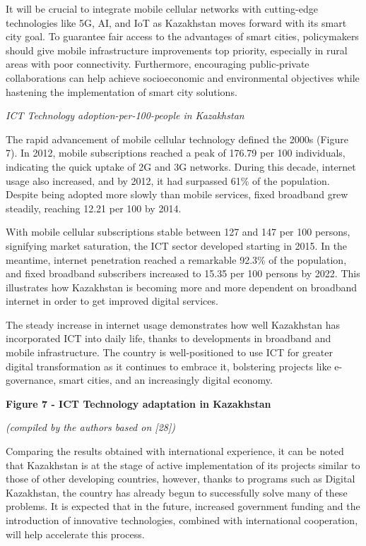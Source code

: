 {It will be crucial to integrate mobile cellular networks with
cutting-edge technologies like 5G, AI, and IoT as Kazakhstan moves
forward with its smart city goal. To guarantee fair access to the
advantages of smart cities, policymakers should give mobile
infrastructure improvements top priority, especially in rural areas with
poor connectivity. Furthermore, encouraging public-private
collaborations can help achieve socioeconomic and environmental
objectives while hastening the implementation of smart city solutions.

\emph{ICT Technology adoption-per-100-people in Kazakhstan}

The rapid advancement of mobile cellular technology defined the 2000s
(Figure 7). In 2012, mobile subscriptions reached a peak of 176.79 per
100 individuals, indicating the quick uptake of 2G and 3G networks.
During this decade, internet usage also increased, and by 2012, it had
surpassed 61\% of the population. Despite being adopted more slowly than
mobile services, fixed broadband grew steadily, reaching 12.21 per 100
by 2014.

With mobile cellular subscriptions stable between 127 and 147 per 100
persons, signifying market saturation, the ICT sector developed starting
in 2015. In the meantime, internet penetration reached a remarkable
92.3\% of the population, and fixed broadband subscribers increased to
15.35 per 100 persons by 2022. This illustrates how Kazakhstan is
becoming more and more dependent on broadband internet in order to get
improved digital services.

The steady increase in internet usage demonstrates how well Kazakhstan
has incorporated ICT into daily life, thanks to developments in
broadband and mobile infrastructure. The country is well-positioned to
use ICT for greater digital transformation as it continues to embrace
it, bolstering projects like e-governance, smart cities, and an
increasingly digital economy.

{\bfseries Figure 7 - ICT Technology adaptation in Kazakhstan}

\emph{(compiled by the authors based on {[}28{]})}

Comparing the results obtained with international experience, it can be
noted that Kazakhstan is at the stage of active implementation of its
projects similar to those of other developing countries, however, thanks
to programs such as Digital Kazakhstan, the country has already begun to
successfully solve many of these problems. It is expected that in the
future, increased government funding and the introduction of innovative
technologies, combined with international cooperation, will help
accelerate this process.

}
